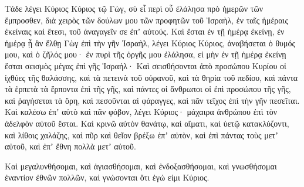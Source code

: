 {\par }{\PP {}Τάδε λέγει Κύριος Κύριος τῷ Γὼγ, σὺ εἶ περὶ οὗ ἐλάλησα πρὸ ἡμερῶν τῶν ἔμπροσθεν, διὰ χειρὸς τῶν δούλων μου τῶν προφητῶν τοῦ Ἰσραὴλ, ἐν ταῖς ἡμέραις ἐκείναις καὶ ἔτεσι, τοῦ ἀναγαγεῖν σε ἐπʼ αὐτούς.
Καὶ ἔσται ἐν τῇ ἡμέρᾳ ἐκείνῃ, ἐν ἡμέρᾳ ᾗ ἂν ἔλθῃ Γὼγ ἐπὶ τὴν γῆν Ἰσραὴλ, λέγει Κύριος Κύριος, ἀναβήσεται ὁ θυμός μου,
καὶ ὁ ζῆλός μου· ἐν πυρὶ τῆς ὀργῆς μου ἐλάλησα, εἰ μὴν ἐν τῇ ἡμέρᾳ ἐκείνῃ ἔσται σεισμὸς μέγας ἐπὶ γῆς Ἰσραήλ·
Καὶ σεισθήσονται ἀπὸ προσώπου Κυρίου οἱ ἰχθύες τῆς θαλάσσης, καὶ τὰ πετεινὰ τοῦ οὐρανοῦ, καὶ τὰ θηρία τοῦ πεδίου, καὶ πάντα τὰ ἑρπετὰ τὰ ἕρποντα ἐπὶ τῆς γῆς, καὶ πάντες οἱ ἄνθρωποι οἱ ἐπὶ προσώπου τῆς γῆς, καὶ ῥαγήσεται τὰ ὄρη, καὶ πεσοῦνται αἱ φάραγγες, καὶ πᾶν τεῖχος ἐπὶ τὴν γῆν πεσεῖται.
Καὶ καλέσω ἐπʼ αὐτὸ καὶ πᾶν φόβον, λέγει Κύριος· μάχαιρα ἀνθρώπου ἐπὶ τὸν ἀδελφὸν αὐτοῦ ἔσται.
Καὶ κρινῶ αὐτὸν θανάτῳ, καὶ αἵματι, καὶ ὑετῷ κατακλύζοντι, καὶ λίθοις χαλάζης, καὶ πῦρ καὶ θεῖον βρέξω ἐπʼ αὐτὸν, καὶ ἐπὶ πάντας τοὺς μετʼ αὐτοῦ, καὶ ἐπʼ ἔθνη πολλὰ μετʼ αὐτοῦ.
\par }{\PP {}Καὶ μεγαλυνθήσομαι, καὶ ἁγιασθήσομαι, καὶ ἐνδοξασθήσομαι, καὶ γνωσθήσομαι ἐναντίον ἐθνῶν πολλῶν, καὶ γνώσονται ὅτι ἐγώ εἰμι Κύριος.

}

